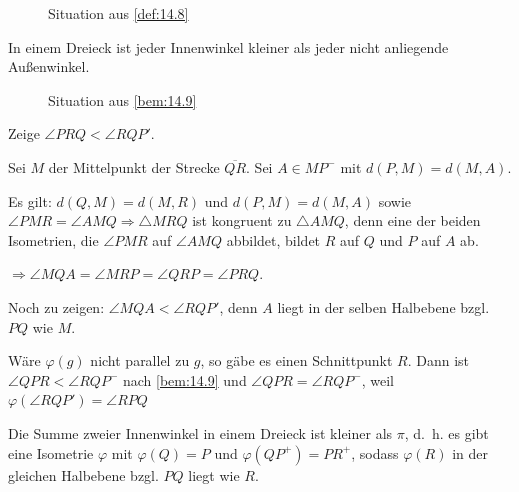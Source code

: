 \begin{figure}[ht]
    \centering
    \label{fig:def.14.8.0}
    \caption{Situation aus \cref{def:14.8}}
\end{figure}

\begin{bemerkung}\label{bem:14.9}%
    In einem Dreieck ist jeder Innenwinkel kleiner als jeder nicht 
    anliegende Außenwinkel.
\end{bemerkung}

\begin{figure}[htp]
    \centering
    
    \caption{Situation aus \cref{bem:14.9}}
    \label{fig:bem.14.9}
\end{figure}

\begin{beweis}
    Zeige $\angle PRQ < \angle RQP'$.

    Sei $M$ der Mittelpunkt der Strecke $\overline{QR}$. Sei
    $A \in MP^-$ mit $d(P,M) = d(M,A)$.

    Es gilt: $d(Q,M) = d(M,R)$ und $d(P,M) = d(M,A)$ sowie 
    $\angle PMR = \angle AMQ \Rightarrow \triangle MRQ$ ist
    kongruent zu $\triangle AMQ$, denn eine der beiden Isometrien, die
    $\angle PMR$ auf $\angle AMQ$ abbildet, bildet $R$ auf $Q$ und
    $P$ auf $A$ ab.

    $\Rightarrow \angle MQA = \angle MRP = \angle QRP = \angle PRQ$.

    Noch zu zeigen: $\angle MQA < \angle RQP'$, denn $A$ liegt in der
    selben Halbebene bzgl. $PQ$ wie $M$.
\end{beweis}

\begin{beweis}
    Wäre $\varphi(g)$ nicht parallel zu $g$, so gäbe es einen 
    Schnittpunkt $R$. Dann ist $\angle QPR < \angle RQP^-$ nach
    \cref{bem:14.9} und $\angle QPR = \angle RQP^-$, weil
    $\varphi(\angle RQP') = \angle RPQ$
\end{beweis}

\begin{folgerung}\label{folgerung:14.10}%
    Die Summe zweier Innenwinkel in einem Dreieck ist kleiner als
    $\pi$, d.~h. es gibt eine Isometrie $\varphi$ mit $\varphi(Q) = P$
    und $\varphi(QP^+) = PR^+$, sodass $\varphi(R)$ in der gleichen
    Halbebene bzgl. $PQ$ liegt wie $R$.
\end{folgerung}

